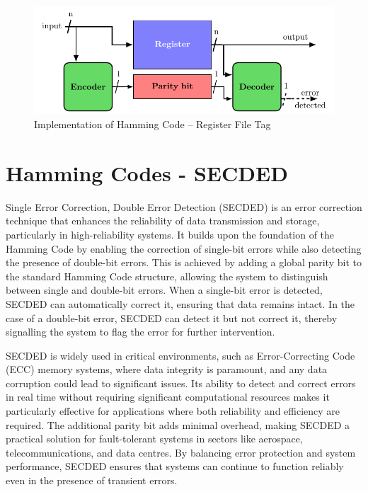 \begin{figure}[ht]
    \centering
    \includegraphics[page=3, width=\textwidth]{c5_countermeasures_dift/img/archi_contremesures.pdf}
    \caption{Implementation of Hamming Code -- Register File Tag}
    \label{fig:implementation_hc_2}
\end{figure}


\section{Hamming Codes - SECDED}
\label{section:chap5_secded}

Single Error Correction, Double Error Detection (SECDED) is an error correction technique that enhances the reliability of data transmission and storage, particularly in high-reliability systems. It builds upon the foundation of the Hamming Code by enabling the correction of single-bit errors while also detecting the presence of double-bit errors. This is achieved by adding a global parity bit to the standard Hamming Code structure, allowing the system to distinguish between single and double-bit errors. When a single-bit error is detected, SECDED can automatically correct it, ensuring that data remains intact. In the case of a double-bit error, SECDED can detect it but not correct it, thereby signalling the system to flag the error for further intervention.

SECDED is widely used in critical environments, such as Error-Correcting Code (ECC) memory systems, where data integrity is paramount, and any data corruption could lead to significant issues. Its ability to detect and correct errors in real time without requiring significant computational resources makes it particularly effective for applications where both reliability and efficiency are required. The additional parity bit adds minimal overhead, making SECDED a practical solution for fault-tolerant systems in sectors like aerospace, telecommunications, and data centres. By balancing error protection and system performance, SECDED ensures that systems can continue to function reliably even in the presence of transient errors.

